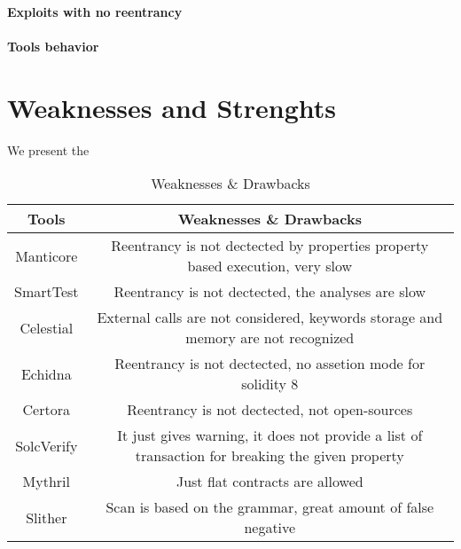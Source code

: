 \paragraph{Exploits with no reentrancy}

\paragraph{Tools behavior} 







\section{Weaknesses and Strenghts}

We present the 
\begin{table*}
    \caption{Weaknesses \& Drawbacks}
    \label{tab:Weaknesses}
    \begin{tabular}{cc}
    \toprule
        Tools  &  Weaknesses \& Drawbacks \\
        \midrule
        Manticore & Reentrancy is not dectected by properties property 
        based execution, very slow \\
        SmartTest & Reentrancy is not dectected, the analyses are slow \\
        Celestial & External calls are not considered, keywords storage and 
        memory are not recognized  \\
        Echidna &  Reentrancy is not dectected, no assetion mode for solidity 8\\
        Certora & Reentrancy is not dectected, not open-sources \\ 
        SolcVerify & It just gives warning, it does not provide a list of 
        transaction for breaking the given property\\
        Mythril & Just flat contracts are allowed \\ 
        Slither & Scan is based on the grammar, great amount of false negative \\ 
    \bottomrule
    \end{tabular}
\end{table*}

